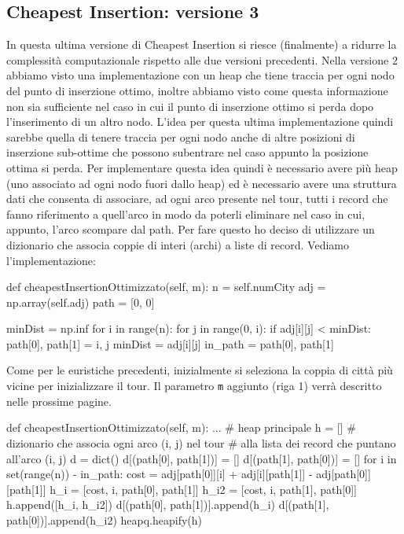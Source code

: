 \documentclass[a4paper,12pt]{report}
\begin{document}
\subsection{Cheapest Insertion: versione 3}
In questa ultima versione di Cheapest Insertion si riesce (finalmente) a ridurre la complessità computazionale rispetto alle due versioni precedenti. Nella versione 2 abbiamo visto una implementazione con un heap che tiene traccia per ogni nodo del punto di inserzione ottimo, inoltre abbiamo visto come questa informazione non sia sufficiente nel caso in cui il punto di inserzione ottimo si perda dopo l'inserimento di un altro nodo. L'idea per questa ultima implementazione quindi sarebbe quella di tenere traccia per ogni nodo anche di altre posizioni di inserzione sub-ottime che possono subentrare nel caso appunto la posizione ottima si perda. Per implementare questa idea quindi è necessario avere più heap (uno associato ad ogni nodo fuori dallo heap) ed è necessario avere una struttura dati che consenta di associare, ad ogni arco presente nel tour, tutti i record che fanno riferimento a quell'arco in modo da poterli eliminare nel caso in cui, appunto, l'arco scompare dal path. Per fare questo ho deciso di utilizzare un dizionario che associa coppie di interi (archi) a liste di record. Vediamo l'implementazione:
\begin{python}
def cheapestInsertionOttimizzato(self, m):
  n = self.numCity
  adj = np.array(self.adj)
  path = [0, 0]

  minDist = np.inf
  for i in range(n):
    for j in range(0, i):
      if adj[i][j] < minDist:
        path[0], path[1] = i, j
        minDist = adj[i][j]
  in_path = {path[0], path[1]}
\end{python}
Come per le euristiche precedenti, inizialmente si seleziona la coppia di città più vicine per inizializzare il tour. Il parametro \lstinline!m! aggiunto (riga 1) verrà descritto nelle prossime pagine.
\begin{python}
def cheapestInsertionOttimizzato(self, m):
  ...
  # heap principale
  h = []
  # dizionario che associa ogni arco (i, j) nel tour
  # alla lista dei record che puntano all'arco (i, j)
  d = dict()
  d[(path[0], path[1])] = []
  d[(path[1], path[0])] = []
  for i in set(range(n)) - in_path:
    cost = adj[path[0]][i] + adj[i][path[1]] - adj[path[0]][path[1]]
    h_i = [cost, i, path[0], path[1]]
    h_i2 = [cost, i, path[1], path[0]]
    h.append([h_i, h_i2])
    d[(path[0], path[1])].append(h_i)
    d[(path[1], path[0])].append(h_i2)
  heapq.heapify(h)
\end{python}
\end{document}
